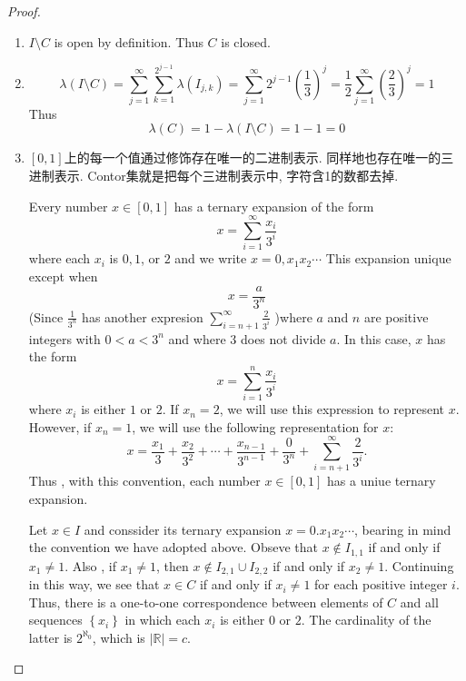 \documentclass[../main.tex]{subfiles}
\begin{document}
\begin{proof}
    \begin{enumerate}
        \item \(  I\setminus C  \) is open by definition. Thus \(  C  \) is closed.
        \item  \[
         \lambda \left( I\setminus C \right)=  \sum _{j = 1}^{\infty}\sum _{k = 1}^{2^{j-1}}  \lambda \left( I_{j,k} \right)= \sum _{j = 1}^{\infty}2^{j-1}\left( \frac{1 }{3 }  \right)^{j}= \frac{1 }{2 } \sum _{j = 1}^{\infty}\left( \frac{2 }{3 }  \right)^{j}= 1     
        \]  Thus \[
         \lambda \left( C \right)= 1- \lambda \left( I\setminus C \right)= 1-1= 0  
        \]
        \item 
        

        
        \begin{note}
            \(  \left[ 0,1 \right]   \)上的每一个值通过修饰存在唯一的二进制表示. 同样地也存在唯一的三进制表示. Contor集就是把每个三进制表示中, 字符含1的数都去掉.  
        \end{note}Every number \(  x \in \left[ 0,1 \right]   \) has a ternary expansion of the form \[
        x = \sum _{i = 1}^{\infty} \frac{x_{i} }{3^{i} } 
        \]  where each \(  x_{i}  \) is \(  0,1  \), or \(  2  \) and we write \(  x = 0,x_1x_2\cdots   \) This expansion   unique except when \[
        x = \frac{a }{3^{n} } 
        \] (Since \(  \frac{1 }{3^{n} }   \) has another expresion \(  \sum _{i = n+ 1}^{\infty}\frac{2 }{3^{i} }   \)  )where \(  a  \) and \(  n  \) are  positive integers with \(  0< a< 3^{n}  \) and where \(  3  \) does not divide \(  a  \). In this case, \(  x  \) has the form \[
        x = \sum _{i = 1}^{n} \frac{x_{i} }{3^{i} } 
        \]where \(  x_{i}  \) is either \(  1  \) or \(  2  \). If \(  x_{n}= 2  \), we will use this expression to represent \(  x  \). However, if \(  x_{n}= 1  \), we will use the following representation for \(  x  \): \[
        x = \frac{x_1 }{3 }+ \frac{x_2 }{3^{2} }+ \cdots +  \frac{x_{n-1} }{3^{n-1} }+ \frac{0 }{3^{n} }+ \sum _{i = n+ 1}^{\infty}\frac{2 }{3^{i} }     .
        \] Thus , with this convention, each number \(  x \in \left[ 0,1 \right]   \) has a uniue ternary expansion.          
        
        Let \(  x \in I  \) and conssider its ternary expansion \(  x = 0.x_1x_2\cdots   \), bearing in mind the convention we have adopted above. Obseve that \(  x\not \in I_{1,1}  \) if and only if \(  x_1\neq 1  \). Also , if \(  x_1\neq 1  \), then \(  x\not \in  I_{2,1}\cup I_{2,2}  \) if and only if \(  x_2\neq 1  \).       Continuing in this way, we see that \(  x \in C  \) if and only if \(  x_{i}\neq 1  \) for each positive integer \(  i  \). Thus, there is a one-to-one correspondence between elements of  \(  C  \) and all sequences \(  \left\{ x_{i} \right\}   \) in which each \(  x_{i}   \) is either \(  0  \) or \(  2  \).        The cardinality of the latter is \(  2^{\aleph_0}  \), which is \(  \left| \mathbb{R}  \right|= c   \).   
    \end{enumerate}
    
\end{proof}
\end{document}
